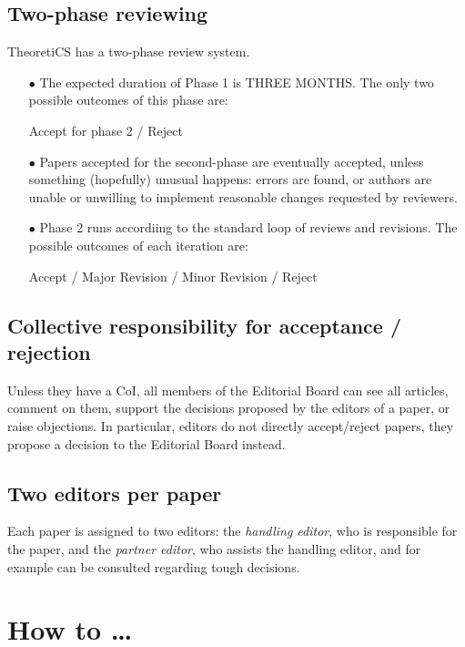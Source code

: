 \documentclass[runningheads]{llncs}
\begin{document}
\subsection*{Two-phase reviewing}
TheoretiCS has a two-phase review system. 
\begin{itemize}
\item[$\bullet$] 
The expected duration of Phase 1 is  THREE MONTHS. The only two possible outcomes of this phase are: 
\begin{center}
Accept for phase 2 / Reject
\end{center}

\item[$\bullet$] Papers accepted for the second-phase are eventually accepted,
unless something (hopefully) unusual happens: errors are found, or  authors are unable or unwilling to implement reasonable changes 
requested by reviewers.

\item[$\bullet$] Phase 2 runs accordiing to the standard loop of reviews and revisions. The possible outcomes 
of each iteration are:

\begin{center}
Accept / Major Revision / Minor Revision / Reject
\end{center}
\end{itemize}

\subsection*{Collective responsibility for acceptance / rejection}

Unless they have a CoI, all members of the Editorial Board can see all articles,
comment on them, support the decisions proposed by the editors of a paper, or raise objections.
In particular, editors do not directly accept/reject papers, they propose a decision 
to the Editorial Board instead.

\subsection*{Two editors per paper}

Each paper is assigned to two editors: the \emph{handling editor}, who
is responsible for the paper, and the \emph{partner editor}, who
assists the handling editor, and for example can be consulted 
regarding tough decisions.


\section{How to \ldots}
\end{document}
